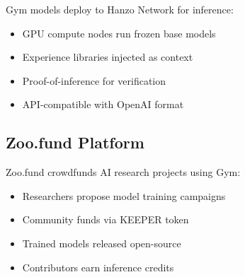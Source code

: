 Gym models deploy to Hanzo Network for inference:
\begin{itemize}
\item GPU compute nodes run frozen base models
\item Experience libraries injected as context
\item Proof-of-inference for verification
\item API-compatible with OpenAI format
\end{itemize}

\subsection{Zoo.fund Platform}

Zoo.fund crowdfunds AI research projects using Gym:
\begin{itemize}
\item Researchers propose model training campaigns
\item Community funds via KEEPER token
\item Trained models released open-source
\item Contributors earn inference credits
\end{itemize}

